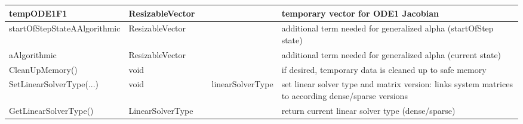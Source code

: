 \begin{center}
\begin{longtable}{| p{4.2cm} | p{2.5cm} | p{0.3cm} | p{3.0cm} | p{6cm} |}
    tempODE1F1 &     ResizableVector &      &      &     temporary vector for ODE1 Jacobian\\ \hline
    startOfStepStateAAlgorithmic &     ResizableVector &      &      &     additional term needed for generalized alpha (startOfStep state)\\ \hline
    aAlgorithmic &     ResizableVector &      &      &     additional term needed for generalized alpha (current state)\\ \hline
    CleanUpMemory() &     void &      &      &     if desired, temporary data is cleaned up to safe memory\\ \hline
    SetLinearSolverType(...) &     void &      &     linearSolverType &     set linear solver type and matrix version: links system matrices to according dense/sparse versions\\ \hline
    GetLinearSolverType() &     LinearSolverType &      &      &     return current linear solver type (dense/sparse)\\ \hline
	  \end{longtable}
	\end{center}

